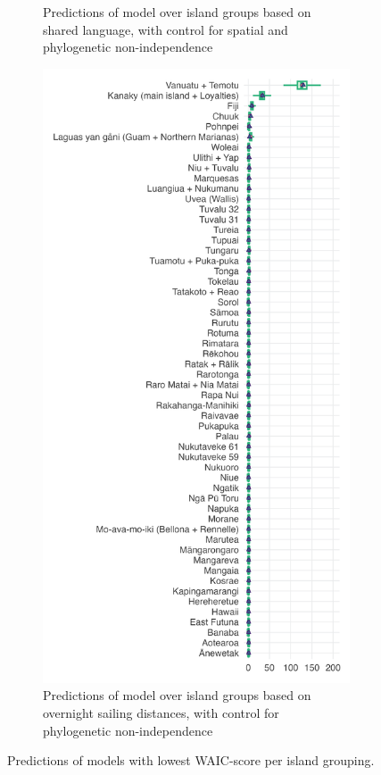 \documentclass[unnumsec,webpdf,modern,medium]{oup-authoring-template}
\begin{document}
\begin{figure}
\begin{subfigure}{0.48\textwidth}
\caption{Predictions of model over island groups based on shared language, with control for spatial and phylogenetic non-independence}
\label{medium_model_predict}
\end{subfigure}%
\hfill
\begin{subfigure}{0.48\textwidth}
  \centering
  \includegraphics[width=1\textwidth]{brms_predict_SBZR_control_phylo.png}
  \caption{Predictions of model over island groups based on overnight sailing distances, with control for phylogenetic non-independence}
\label{SBZR_model_predict}
\end{subfigure}
\caption{Predictions of models with lowest WAIC-score per island grouping.}
\label{prediction_plot}
\end{figure}
\end{document}
